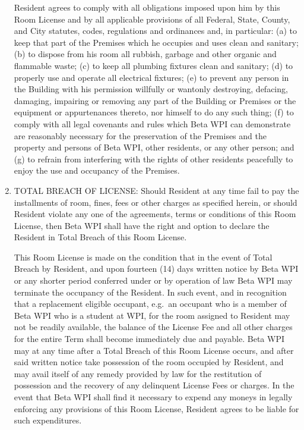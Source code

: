 \documentclass[legalpaper, 12pt]{article} \usepackage{lease}
\begin{document}
\begin{enumerate}
                Resident agrees to comply with all obligations imposed upon him
                by this Room License and by all applicable provisions of all
                Federal, State, County, and City statutes, codes, regulations
                and ordinances and, in particular: (a) to keep that part of the
                Premises which he occupies and uses clean and sanitary; (b) to
                dispose from his room all rubbish, garbage and other organic and
                flammable waste; (c) to keep all plumbing fixtures clean and
                sanitary; (d) to properly use and operate all electrical
                fixtures; (e) to prevent any person in the Building with his
                permission willfully or wantonly destroying, defacing, damaging,
                impairing or removing any part of the Building or Premises or
                the equipment or appurtenances thereto, nor himself to do any
                such thing; (f) to comply with all legal covenants and rules
                which Beta WPI can demonstrate are reasonably necessary for the
                preservation of the Premises and the property and persons of
                Beta WPI, other residents, or any other person; and (g) to
                refrain from interfering with the rights of other residents
                peacefully to enjoy the use and occupancy of the Premises.

        \item TOTAL BREACH OF LICENSE:  Should Resident at any time fail to pay
                the installments of room, fines, fees or other charges as
                specified herein, or should Resident violate any one of the
                agreements, terms or conditions of this Room License, then Beta
                WPI shall have the right and option to declare the Resident in
                Total Breach of this Room License.

                This Room License is made on the condition that in the event of
                Total Breach by Resident, and upon fourteen (14) days written
                notice by Beta WPI or any shorter period conferred under or by
                operation of law Beta WPI may terminate the occupancy of the
                Resident.  In such event, and in recognition that a replacement
                eligible occupant, e.g.\ an occupant who is a member of Beta WPI
                who is a student at WPI, for the room assigned to Resident may
                not be readily available, the balance of the License Fee and all
                other charges for the entire Term shall become immediately due
                and payable.  Beta WPI may at any time after a Total Breach of
                this Room License occurs, and after said written notice take
                possession of the room occupied by Resident, and may avail
                itself of any remedy provided by law for the restitution of
                possession and the recovery of any delinquent License Fees or
                charges.  In the event that Beta WPI shall find it necessary to
                expend any moneys in legally enforcing any provisions of this
                Room License, Resident agrees to be liable for such
                expenditures.


\end{enumerate}
\end{document}
